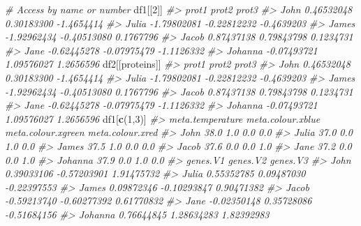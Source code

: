 \documentclass[
]{article}
\newenvironment{Shaded}{\begin{snugshade}}{\end{snugshade}}
\newcommand{\CommentTok}[1]{\textcolor[rgb]{0.56,0.35,0.01}{\textit{#1}}}
\newcommand{\DecValTok}[1]{\textcolor[rgb]{0.00,0.00,0.81}{#1}}
\newcommand{\FunctionTok}[1]{\textcolor[rgb]{0.13,0.29,0.53}{\textbf{#1}}}
\newcommand{\NormalTok}[1]{#1}
\newcommand{\StringTok}[1]{\textcolor[rgb]{0.31,0.60,0.02}{#1}}
\begin{document}
\begin{Shaded}
\begin{Highlighting}[]
\CommentTok{\# Access by name or number}
\NormalTok{df1[[}\DecValTok{2}\NormalTok{]]}
\CommentTok{\#\textgreater{}               prot1       prot2      prot3}
\CommentTok{\#\textgreater{} John     0.46532048  0.30183300 {-}1.4654414}
\CommentTok{\#\textgreater{} Julia   {-}1.79802081 {-}0.22812232 {-}0.4639203}
\CommentTok{\#\textgreater{} James   {-}1.92962434 {-}0.40513080  0.1767796}
\CommentTok{\#\textgreater{} Jacob    0.87437138  0.79843798  0.1234731}
\CommentTok{\#\textgreater{} Jane    {-}0.62445278 {-}0.07975479 {-}1.1126332}
\CommentTok{\#\textgreater{} Johanna {-}0.07493721  1.09576027  1.2656596}
\NormalTok{df2[[}\StringTok{\textquotesingle{}proteins\textquotesingle{}}\NormalTok{]]}
\CommentTok{\#\textgreater{}               prot1       prot2      prot3}
\CommentTok{\#\textgreater{} John     0.46532048  0.30183300 {-}1.4654414}
\CommentTok{\#\textgreater{} Julia   {-}1.79802081 {-}0.22812232 {-}0.4639203}
\CommentTok{\#\textgreater{} James   {-}1.92962434 {-}0.40513080  0.1767796}
\CommentTok{\#\textgreater{} Jacob    0.87437138  0.79843798  0.1234731}
\CommentTok{\#\textgreater{} Jane    {-}0.62445278 {-}0.07975479 {-}1.1126332}
\CommentTok{\#\textgreater{} Johanna {-}0.07493721  1.09576027  1.2656596}
\NormalTok{df1[}\FunctionTok{c}\NormalTok{(}\DecValTok{1}\NormalTok{,}\DecValTok{3}\NormalTok{)]}
\CommentTok{\#\textgreater{}         meta.temperature meta.colour.xblue meta.colour.xgreen meta.colour.xred}
\CommentTok{\#\textgreater{} John                38.0               1.0                0.0              0.0}
\CommentTok{\#\textgreater{} Julia               37.0               0.0                1.0              0.0}
\CommentTok{\#\textgreater{} James               37.5               1.0                0.0              0.0}
\CommentTok{\#\textgreater{} Jacob               37.6               0.0                0.0              1.0}
\CommentTok{\#\textgreater{} Jane                37.2               0.0                0.0              1.0}
\CommentTok{\#\textgreater{} Johanna             37.9               0.0                1.0              0.0}
\CommentTok{\#\textgreater{}            genes.V1    genes.V2    genes.V3}
\CommentTok{\#\textgreater{} John     0.39033106 {-}0.57203901  1.91475732}
\CommentTok{\#\textgreater{} Julia    0.55352785  0.09487030 {-}0.22397553}
\CommentTok{\#\textgreater{} James    0.09872346 {-}0.10293847  0.90471382}
\CommentTok{\#\textgreater{} Jacob   {-}0.59213740 {-}0.60277392  0.61770832}
\CommentTok{\#\textgreater{} Jane    {-}0.02350148  0.35728086 {-}0.51684156}
\CommentTok{\#\textgreater{} Johanna  0.76644845  1.28634283  1.82392983}

\end{Highlighting}
\end{Shaded}
\end{document}
